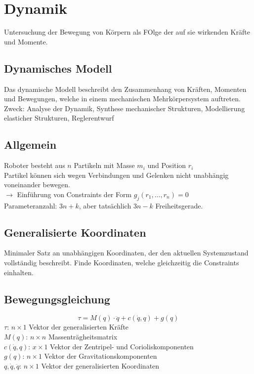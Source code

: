 

\section{Dynamik}
Untersuchung der Bewegung von Körpern als FOlge der auf sie wirkenden Kräfte und Momente.

\subsection{Dynamisches Modell}
Das dynamische Modell beschreibt den Zusammenhang von Kräften, Momenten und Bewegungen, welche in einem mechanischen
Mehrkörpersystem auftreten.\\

Zweck: Analyse der Dynamik, Synthese mechanischer Strukturen, Modellierung elasticher Strukturen, Reglerentwurf

\subsection{Allgemein}
Roboter besteht aus \(n\) Partikeln mit Masse \(m_i\) und Position \(r_i\)\\
Partikel können sich wegen Verbindungen und Gelenken nicht unabhängig voneinander bewegen.\\
\(\rightarrow\) Einführung von Constraints der Form \(g_j(r_1, \ldots, r_n) = 0\)\\

Parameteranzahl: \(3n + k\), aber tatsächlich \(3n-k\) Freiheitsgerade.

\subsection{Generalisierte Koordinaten}
Minimaler Satz an unabhängigen Koordinaten, der den aktuellen Systemzustand vollständig beschreibt.
Finde Koordinaten, welche gleichzeitig die Constraints einhalten.


\subsection{Bewegungsgleichung}
\[\tau = M(q) \cdot \ddot{q} + c(\dot{q}, q) + g(q)\]
\(\tau\): \(n \times 1\) Vektor der generalisierten Kräfte\\
\(M(q)\): \(n \times n\) Massenträgheitsmatrix\\
\(c(\dot{q}, q)\): \(x \times 1\) Vektor der Zentripel- und Corioliskomponenten\\
\(g(q)\): \(n \times 1 \) Vektor der Gravitationskomponenten\\
\(q, \dot{q}, \ddot{q}\): \(n \times 1\) Vektor der generalisierten Koordinaten

